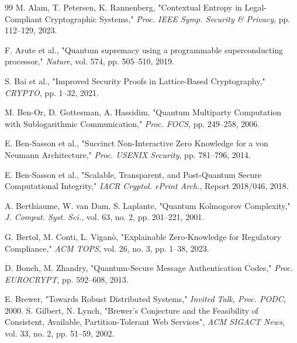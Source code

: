 \documentclass[preprint,12pt]{elsarticle}
\begin{document}
    \newpage
        \begin{thebibliography}{99}
                M. Alam, T. Petersen, K. Rannenberg, 
                "Contextual Entropy in Legal-Compliant Cryptographic Systems," 
                \textit{Proc. IEEE Symp. Security \& Privacy}, pp. 112–129, 2023.

                F. Arute et al., 
                "Quantum supremacy using a programmable superconducting processor," 
                \textit{Nature}, vol. 574, pp. 505–510, 2019.

                S. Bai et al., 
                "Improved Security Proofs in Lattice-Based Cryptography," 
                \textit{CRYPTO}, pp. 1–32, 2021.

                M. Ben-Or, D. Gottesman, A. Hassidim, 
                "Quantum Multiparty Computation with Sublogarithmic Communication," 
                \textit{Proc. FOCS}, pp. 249–258, 2006.

                E. Ben-Sasson et al., 
                "Succinct Non-Interactive Zero Knowledge for a von Neumann Architecture," 
                \textit{Proc. USENIX Security}, pp. 781–796, 2014.

                E. Ben-Sasson et al., 
                "Scalable, Transparent, and Post-Quantum Secure Computational Integrity," 
                \textit{IACR Cryptol. ePrint Arch.}, Report 2018/046, 2018.

                A. Berthiaume, W. van Dam, S. Laplante, 
                "Quantum Kolmogorov Complexity," 
                \textit{J. Comput. Syst. Sci.}, vol. 63, no. 2, pp. 201–221, 2001.

                G. Bertol, M. Conti, L. Viganò, 
                "Explainable Zero-Knowledge for Regulatory Compliance," 
                \textit{ACM TOPS}, vol. 26, no. 3, pp. 1–38, 2023.

                D. Boneh, M. Zhandry, 
                "Quantum-Secure Message Authentication Codes," 
                \textit{Proc. EUROCRYPT}, pp. 592–608, 2013.

                E. Brewer, 
                "Towards Robust Distributed Systems," 
                \textit{Invited Talk, Proc. PODC}, 2000.
                S. Gilbert, N. Lynch, 
                "Brewer's Conjecture and the Feasibility of Consistent, Available, Partition-Tolerant Web Services", 
                \textit{ACM SIGACT News}, vol. 33, no. 2, pp. 51–59, 2002.
                

\end{thebibliography}
\end{document}
